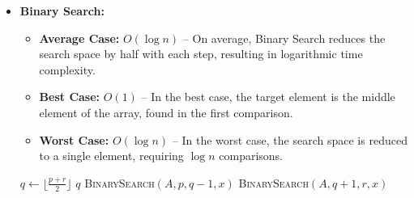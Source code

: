 \documentclass[12pt]{book} %
\begin{document}
\begin{itemize}
    \item \textbf{Binary Search:}
        \begin{itemize}
            \item \textbf{Average Case:} $O(\log n)$ – On average, Binary Search reduces the search space by half with each step, resulting in logarithmic time complexity.
            \item \textbf{Best Case:} $O(1)$ – In the best case, the target element is the middle element of the array, found in the first comparison.
            \item \textbf{Worst Case:} $O(\log n)$ – In the worst case, the search space is reduced to a single element, requiring $\log n$ comparisons.
        \end{itemize}
        \begin{algorithm}
            \caption{Binary Search}
            \begin{algorithmic}[1]
                        \State $q \gets \lfloor \frac{p + r}{2} \rfloor$
                            \State \Return $q$
                            \State \Return \textsc{BinarySearch}$(A, p, q-1, x)$
                        \Else
                            \State \Return \textsc{BinarySearch}$(A, q+1, r, x)$
                        \EndIf
                    \Else
                        \State {}
                    \EndIf
                    \EndProcedure
                \end{algorithmic}
            \end{algorithm}
\end{itemize}
\end{document}
